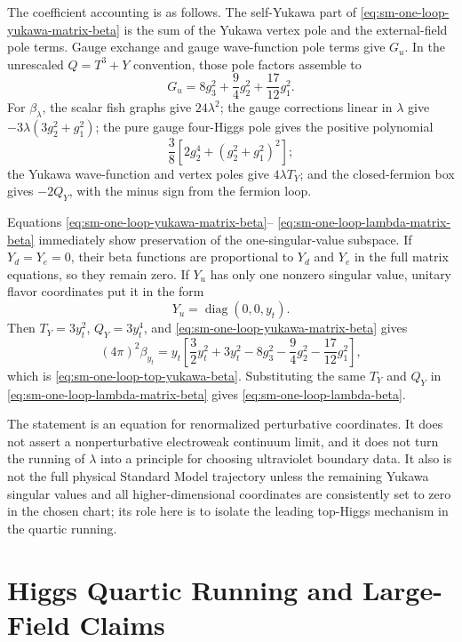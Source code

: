 The coefficient accounting is as follows.  The self-Yukawa part of
\eqref{eq:sm-one-loop-yukawa-matrix-beta} is the sum of the Yukawa vertex
pole and the external-field pole terms.  Gauge exchange and gauge
wave-function pole terms give \(G_u\).  In the unrescaled
\(Q=T^3+Y\) convention, those pole factors assemble to
\[
  G_u=8g_3^2+\frac94g_2^2+\frac{17}{12}g_1^2 .
\]
For \(\beta_\lambda\), the scalar fish graphs give \(24\lambda^2\); the
gauge corrections linear in \(\lambda\) give
\(-3\lambda(3g_2^2+g_1^2)\); the pure gauge four-Higgs pole gives the
positive polynomial
\[
  \frac38\left[2g_2^4+(g_2^2+g_1^2)^2\right];
\]
the Yukawa wave-function and vertex poles give \(4\lambda T_Y\); and the
closed-fermion box gives \(-2Q_Y\), with the minus sign from the fermion
loop.

Equations \eqref{eq:sm-one-loop-yukawa-matrix-beta}--%
\eqref{eq:sm-one-loop-lambda-matrix-beta} immediately show preservation of
the one-singular-value subspace.  If \(Y_d=Y_e=0\), their beta functions are
proportional to \(Y_d\) and \(Y_e\) in the full matrix equations, so they
remain zero.  If \(Y_u\) has only one nonzero singular value, unitary flavor
coordinates put it in the form
\[
  Y_u=\operatorname{diag}(0,0,y_t).
\]
Then \(T_Y=3y_t^2\), \(Q_Y=3y_t^4\), and
\eqref{eq:sm-one-loop-yukawa-matrix-beta} gives
\[
  (4\pi)^2\beta_{y_t}
  =
  y_t\left[
    \frac32y_t^2+3y_t^2
    -8g_3^2-\frac94g_2^2-\frac{17}{12}g_1^2
  \right],
\]
which is \eqref{eq:sm-one-loop-top-yukawa-beta}.  Substituting the same
\(T_Y\) and \(Q_Y\) in \eqref{eq:sm-one-loop-lambda-matrix-beta} gives
\eqref{eq:sm-one-loop-lambda-beta}.

The statement is an equation for renormalized perturbative coordinates.  It
does not assert a nonperturbative electroweak continuum limit, and it does
not turn the running of \(\lambda\) into a principle for choosing ultraviolet
boundary data.  It also is not the full physical Standard Model trajectory
unless the remaining Yukawa singular values and all higher-dimensional
coordinates are consistently set to zero in the chosen chart; its role here
is to isolate the leading top-Higgs mechanism in the quartic running.

\section{Higgs Quartic Running and Large-Field Claims}

